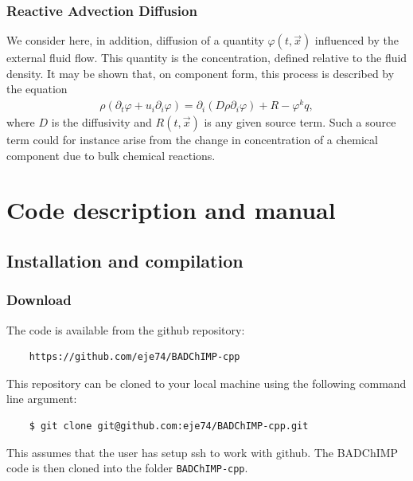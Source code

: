 \documentclass[11pt,a4paper]{report}
\begin{document}
\subsection{Reactive Advection Diffusion}
We consider here, in addition, diffusion of a quantity $\varphi(t,\vec{x})$ influenced by the external fluid flow. This quantity is the concentration,
defined relative to the fluid density. It may be shown \cite{landau87} that, on component form, this process is described by the
equation
\begin{align}
\rho (\partial_t \varphi + u_i \partial_i \varphi) = \partial_i (D \rho \partial_i \varphi) + R - \varphi^k q,\label{eq:AD_eq}
\end{align}
where $D$ is the diffusivity and $R (t,\vec{x})$ is any given source term.
Such a source term could for instance arise from the change in concentration of a chemical component due to bulk chemical
reactions.



\chapter{Code description and manual} 
\label{sec:code description and manual}
\section{Installation and compilation}
\label{sec:Installation}

\subsection{Download}
The code is available from the github repository: 
\begin{verbatim}
	https://github.com/eje74/BADChIMP-cpp
\end{verbatim}
This repository can be cloned to your local machine using the following command line argument:
\begin{verbatim}
    $ git clone git@github.com:eje74/BADChIMP-cpp.git
\end{verbatim}
This assumes that the user has setup ssh to work with github. The BADChIMP code is then cloned into the folder \texttt{BADChIMP-cpp}.
\end{document}
